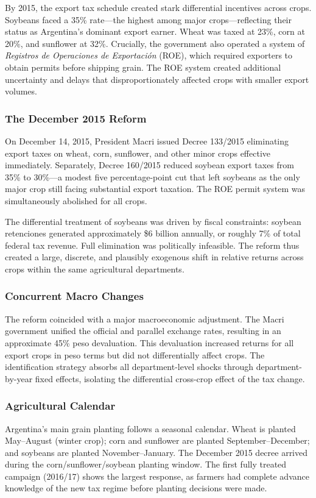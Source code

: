 \documentclass[12pt]{article}
\begin{document}
By 2015, the export tax schedule created stark differential incentives across crops. Soybeans faced a 35\% rate---the highest among major crops---reflecting their status as Argentina's dominant export earner. Wheat was taxed at 23\%, corn at 20\%, and sunflower at 32\%. Crucially, the government also operated a system of \textit{Registros de Operaciones de Exportación} (ROE), which required exporters to obtain permits before shipping grain. The ROE system created additional uncertainty and delays that disproportionately affected crops with smaller export volumes.

\subsubsection*{The December 2015 Reform} On December 14, 2015, President Macri issued Decree 133/2015 eliminating export taxes on wheat, corn, sunflower, and other minor crops effective immediately. Separately, Decree 160/2015 reduced soybean export taxes from 35\% to 30\%---a modest five percentage-point cut that left soybeans as the only major crop still facing substantial export taxation. The ROE permit system was simultaneously abolished for all crops.

The differential treatment of soybeans was driven by fiscal constraints: soybean retenciones generated approximately \$6 billion annually, or roughly 7\% of total federal tax revenue. Full elimination was politically infeasible. The reform thus created a large, discrete, and plausibly exogenous shift in relative returns across crops within the same agricultural departments.

\subsubsection*{Concurrent Macro Changes} The reform coincided with a major macroeconomic adjustment. The Macri government unified the official and parallel exchange rates, resulting in an approximate 45\% peso devaluation. This devaluation increased returns for all export crops in peso terms but did not differentially affect crops. The identification strategy absorbs all department-level shocks through department-by-year fixed effects, isolating the differential cross-crop effect of the tax change.

\subsubsection*{Agricultural Calendar} Argentina's main grain planting follows a seasonal calendar. Wheat is planted May--August (winter crop); corn and sunflower are planted September--December; and soybeans are planted November--January. The December 2015 decree arrived during the corn/sunflower/soybean planting window. The first fully treated campaign (2016/17) shows the largest response, as farmers had complete advance knowledge of the new tax regime before planting decisions were made.
\end{document}
